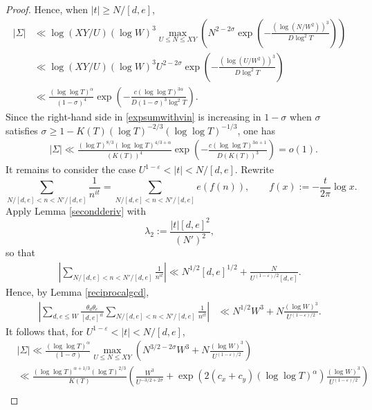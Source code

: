 \documentclass[reqno]{amsart}
\numberwithin{equation}{section}
\theoremstyle{remark}
\begin{document}
\begin{proof}
    Hence, when $|t|\ge N/[d,e]$,
    \begin{equation}\label{expsumwithvin}
    \begin{aligned}
         \left|\Sigma\right|&\ll  \log(XY/U) (\log W)^3\max_{U\le N\le XY}\left(N^{2-2\sigma} \exp\left(-\frac{(\log(N/W^2))^3}{D\log^2T}\right)\right)\\&\ll  \log(XY/U) (\log W)^3U^{2-2\sigma}\exp\left(-\frac{(\log(U/W^2))^3}{D\log^2T}\right)\\&\ll \frac{(\log\log T)^{\alpha}}{(1-\sigma)^4}\exp\left(-\frac{c(\log\log T)^{3\alpha}}{D(1-\sigma)^3\log^2T}\right).
    \end{aligned}
    \end{equation}
    Since the right-hand side in \eqref{expsumwithvin} is increasing in $1-\sigma$ when $\sigma$ satisfies $\sigma\ge 1-K(T)(\log T)^{-2/3}(\log\log T)^{-1/3}$, one has
  \begin{equation}\label{constc5}
  \begin{aligned}
      &\left|\Sigma\right|\ll\frac{(\log T)^{8/3}(\log\log T)^{4/3+\alpha}}{(K(T))^4}\exp\left(-\frac{c(\log\log T)^{3\alpha+1}}{D(K(T))^3}\right)=o(1).
  \end{aligned}
    \end{equation}
    It remains to consider the case $U^{1-\varepsilon}<|t|<N/[d,e]$. Rewrite 
    \[
    \sum_{N/[d,e]<n<N'/[d,e]}\frac{1}{n^{it}}=\sum_{N/[d,e]<n<N'/[d,e]}e(f(n)),\qquad f(x):=-\frac{t}{2\pi}\log x.
    \]
 Apply Lemma \ref{secondderiv} with
 \[
 \lambda_2:=\frac{|t|[d,e]^2}{(N')^2},
 \]
so that
 \begin{align*}
    \left| \sum_{N/[d,e]<n<N'/[d,e]}\frac{1}{n^{it}}\right|\ll N^{1/2}[d,e]^{1/2}+ \frac{N}{U^{(1-\varepsilon)/2}[d,e]}.
 \end{align*}
 Hence, by Lemma \ref{reciprocalgcd},
 \begin{align*}
      \left|\sum_{d,e\le W}\frac{\theta_d\theta_e}{[d,e]^{it}}\sum_{N/[d,e]<n<N'/[d,e]}\frac{1}{n^{it}}\right|&\ll N^{1/2}W^3+N\frac{(\log W)^3}{U^{(1-\varepsilon)/2}}.
 \end{align*}
 It follows that, for $U^{1-\varepsilon}<|t|<N/[d,e]$,
 \begin{equation}\label{constc6}
    \begin{aligned}
       &\left|\Sigma\right|\ll\frac{(\log\log T)^\alpha }{(1-\sigma)}\max_{U\le N\le XY}\left(N^{3/2-2\sigma}W^3+N\frac{(\log W)^3}{U^{(1-\varepsilon)/2}}\right)\\
        &\ll\frac{(\log\log T)^{\alpha+1/3}(\log T)^{2/3} }{K(T)}\left(\frac{W^3}{U^{-3/2+2\sigma}}+\exp(2(c_x+c_y)(\log\log T)^\alpha)\frac{(\log W)^3}{U^{(1-\varepsilon)/2}}\right)\\

\end{aligned}
\end{equation}
\end{proof}
\end{document}
